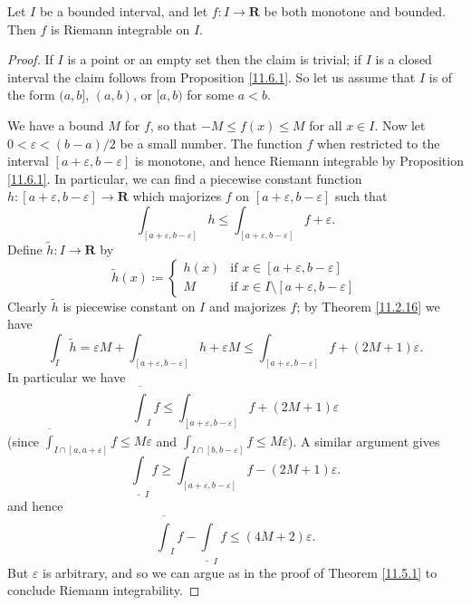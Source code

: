 \begin{corollary}\label{11.6.3}
    Let \(I\) be a bounded interval, and let \(f : I \to \mathbf{R}\) be both monotone and bounded.
    Then \(f\) is Riemann integrable on \(I\).
\end{corollary}

\begin{proof}
    If \(I\) is a point or an empty set then the claim is trivial;
    if \(I\) is a closed interval the claim follows from Proposition \ref{11.6.1}.
    So let us assume that \(I\) is of the form \((a, b]\), \((a, b)\), or \([a, b)\) for some \(a < b\).

    We have a bound \(M\) for \(f\), so that \(-M \leq f(x) \leq M\) for all \(x \in I\).
    Now let \(0 < \varepsilon < (b - a) / 2\) be a small number.
    The function \(f\) when restricted to the interval \([a + \varepsilon, b - \varepsilon]\) is monotone, and hence Riemann integrable by Proposition \ref{11.6.1}.
    In particular, we can find a piecewise constant function \(h : [a + \varepsilon, b - \varepsilon] \to \mathbf{R}\) which majorizes \(f\) on \([a + \varepsilon, b - \varepsilon]\) such that
    \[
        \int_{[a + \varepsilon, b - \varepsilon]} h \leq \int_{[a + \varepsilon, b - \varepsilon]} f + \varepsilon.
    \]
    Define \(\tilde{h} : I \to \mathbf{R}\) by
    \[
        \tilde{h}(x) \coloneqq \begin{cases}
            h(x) & \text{if } x \in [a + \varepsilon, b - \varepsilon]             \\
            M    & \text{if } x \in I \setminus [a + \varepsilon, b - \varepsilon]
        \end{cases}
    \]
    Clearly \(\tilde{h}\) is piecewise constant on \(I\) and majorizes \(f\);
    by Theorem \ref{11.2.16} we have
    \[
        \int_I \tilde{h} = \varepsilon M + \int_{[a + \varepsilon, b - \varepsilon]} h + \varepsilon M \leq \int_{[a + \varepsilon, b - \varepsilon]} f + (2M + 1) \varepsilon.
    \]
    In particular we have
    \[
        \overline{\int}_I f \leq \int_{[a + \varepsilon, b - \varepsilon]} f + (2M + 1) \varepsilon
    \]
    (since \(\overline{\int}_{I \cap [a, a + \varepsilon]} f \leq M \varepsilon\) and \(\overline{\int}_{I \cap [b, b - \varepsilon]} f \leq M \varepsilon\)).
    A similar argument gives
    \[
        \underline{\int}_I f \geq \int_{[a + \varepsilon, b - \varepsilon]} f - (2M + 1) \varepsilon.
    \]
    and hence
    \[
        \overline{\int}_I f - \underline{\int}_I f \leq (4M + 2) \varepsilon.
    \]
    But \(\varepsilon\) is arbitrary, and so we can argue as in the proof of Theorem \ref{11.5.1} to conclude Riemann integrability.
\end{proof}

